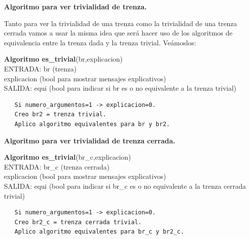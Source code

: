 \begin{center}
	\textbf{Algoritmo para ver trivialidad de trenza.}
\end{center} 
Tanto para ver la trivialidad de una trenza como la trivialidad de una trenza cerrada vamos a usar la misma idea que será hacer uso de los algoritmos de equivalencia entre la trenza dada y la trenza trivial. Veámoslos:

\begin{alg}
	\textbf{Algoritmo es\_trivial}(br,explicacion)\\
	ENTRADA: br (trenza)\\
	\hspace*{2.2cm} explicacion (bool para mostrar mensajes explicativos)\\
	SALIDA: \hspace{0.4cm} equi (bool para indicar si br es o no equivalente a la trenza trivial)
	
\begin{lstlisting}
   Si numero_argumentos=1 -> explicacion=0.
   Creo br2 = trenza trivial. 
   Aplico algoritmo equivalentes para br y br2.
\end{lstlisting}
\end{alg}

\begin{center}
	\textbf{Algoritmo para ver trivialidad de trenza cerrada.}
\end{center} 

\begin{alg}
	\textbf{Algoritmo es\_trivial}(br\_c,explicacion)\\
	ENTRADA: br\_c (trenza cerrada)\\
	\hspace*{2.2cm} explicacion (bool para mostrar mensajes explicativos)\\
	SALIDA: \hspace{0.4cm} equi (bool para indicar si br\_c es o no equivalente a la trenza cerrada trivial)
	
\begin{lstlisting}
   Si numero_argumentos=1 -> explicacion=0.
   Creo br2_c = trenza cerrada trivial. 
   Aplico algoritmo equivalentes para br_c y br2_c.
\end{lstlisting}
\end{alg}

